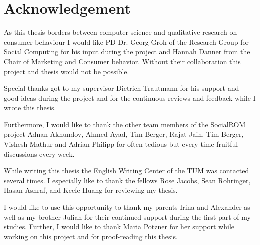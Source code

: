 %
\chapter*{Acknowledgement}
\label{sec:acknowledgement}
\vspace*{-10mm}

As this thesis borders between computer science and qualitative research on consumer behaviour I would like PD Dr. Georg Groh of the Research Group for Social Computing for his input during the project and Hannah Danner from the Chair of Marketing and Consumer behavior. Without their collaboration this project and thesis would not be possible. 

Special thanks got to my supervisor Dietrich Trautmann for his support and good ideas during the project and for the continuous reviews and feedback while I wrote this thesis. 

Furthermore, I would like to thank the other team members of the SocialROM project Adnan Akhundov, Ahmed Ayad, Tim Berger, Rajat Jain, Tim Berger, Vishesh Mathur and Adrian Philipp for often tedious but every-time fruitful discussions every week.

While writing this thesis the English Writing Center of the TUM was contacted several times. I especially like to thank the fellows Rose Jacobs,  Sean Rohringer, Hasan Ashraf, and Keefe Huang for reviewing my thesis.

I would like to use this opportunity to thank my parents Irina and Alexander as well as my brother Julian for their continued support during the first part of my studies. Further, I would like to thank Maria Potzner for her support while working on this project and for proof-reading this thesis. 

